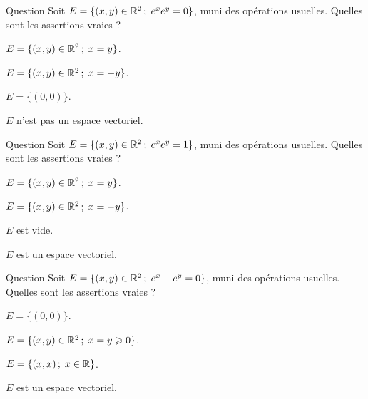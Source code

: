 \begin{multi}[multiple,feedback=
{\(E\) est vide, donc \(E\) n'est pas un espace vectoriel.
}]{Question}
Soit \(E=\{(x,y) \in \mathbb{R}^2 \, ; \;  e^xe^y=0\}\), muni des opérations usuelles. Quelles sont les assertions vraies ?

    \item \(E=\{(x,y) \in \mathbb{R}^2 \,  ; \;  x=y \}\).
    \item \(E=\{(x,y) \in \mathbb{R}^2 \,  ; \;  x=-y \}\).
    \item \(E=\{(0,0)\}\).
    \item* \(E\) n'est pas un espace vectoriel.
\end{multi}


\begin{multi}[multiple,feedback=
{\(E=\{(x,y) \in \Rr^2 \, ; \;  x+y=0\}\) est un sous-espace vectoriel de \(\Rr^2\).
}]{Question}
Soit \(E=\{(x,y) \in \mathbb{R}^2 \,  ; \;  e^xe^y=1\}\), muni des opérations usuelles. Quelles sont les assertions vraies ?

    \item \(E=\{(x,y) \in \mathbb{R}^2 \,  ; \;  x=y \}\).
    \item* \(E=\{(x,y) \in \mathbb{R}^2 \,  ; \;  x=-y \}\).
    \item \(E\) est vide.
    \item* \(E\) est un espace vectoriel.
\end{multi}


\begin{multi}[multiple,feedback=
{\(E=\{(x,y) \in \Rr^2 \, ; \;  x=y \} =\{(x,x) \;   ; \;  x \in \Rr \} \) est 
un sous-espace vectoriel de \(\Rr^2\).
}]{Question}
Soit \(E=\{(x,y) \in \mathbb{R}^2 \,  ;\;  e^x-e^y=0\}\), muni des opérations usuelles. Quelles sont les assertions vraies ?

    \item \(E=\{(0,0)\}\).
    \item \(E=\{(x,y) \in \mathbb{R}^2 \, ; \;  x=y \geqslant 0\}\).
    \item* \(E=\{(x,x) \,   ; \;  x \in \mathbb{R} \}\).
    \item* \(E\) est un espace vectoriel.
\end{multi}


